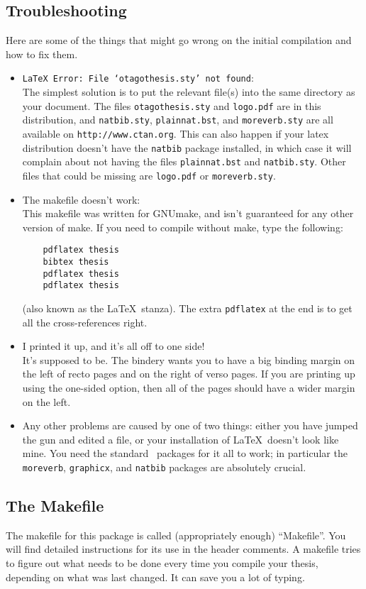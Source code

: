 \subsection{Troubleshooting}
\label{subsec:trouble}
Here are some of the things that might go wrong on the initial
compilation and how to fix them.
\begin{itemize}
\item {\tt LaTeX Error: File `otagothesis.sty' not found}: \\
The simplest solution is to put the relevant
file(s) into the same directory as your document.  The files
\verb|otagothesis.sty| and \verb|logo.pdf| are in this distribution,
and \verb|natbib.sty|, \verb|plainnat.bst|, and \verb|moreverb.sty|
are all available on \verb|http://www.ctan.org|.
This can also happen if your latex distribution doesn't have
the \verb|natbib| package installed, in which case it will complain
about not having the files \verb|plainnat.bst| and \verb|natbib.sty|.
Other files that could be missing are \verb|logo.pdf| or
\verb|moreverb.sty|.  

\item The makefile doesn't work: \\
This makefile was written for GNUmake, and isn't guaranteed for any
other version of make.  If you need to compile without make, type the
following:
\begin{verbatim}
    pdflatex thesis
    bibtex thesis
    pdflatex thesis
    pdflatex thesis
\end{verbatim}
(also known as the \LaTeX\ stanza).  The extra {\tt pdflatex} at the end
is to get all the cross-references right.

\item I printed it up, and it's all off to one side!\\
It's supposed to be.  The bindery wants you to have a big binding
margin on the left of recto pages and on the right of verso pages.
If you are printing up using the one-sided option, then all of the
pages should have a wider margin on the left.
\
\item Any other problems are caused by one of two things: either you
have jumped the gun and edited a file, or your installation of \LaTeX\
doesn't look like mine.  You need the standard \LaTeXe\ packages for
it all to work; in particular the {\tt moreverb}, {\tt graphicx}, and
{\tt natbib} packages are absolutely crucial.
\end{itemize}

\subsection{The Makefile}
\label{subsec:makefile}
The makefile for this package is called (appropriately enough)
``Makefile''.  You will find detailed instructions for its use in the
header comments.  A makefile tries to figure out what needs to be done
every time you compile your thesis, depending on what was last
changed.  It can save you a lot of typing.


